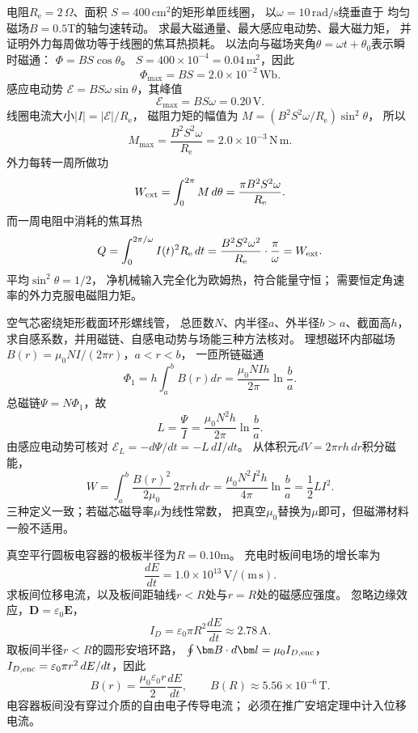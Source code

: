 \problemtext 电阻$R_{\mathrm e}=2\,\Omega$、面积
$S=400\,\mathrm{cm^2}$的矩形单匝线圈，
以$\omega=10\,\mathrm{rad/s}$绕垂直于
均匀磁场$B=0.5$T的轴匀速转动。
求最大磁通量、最大感应电动势、最大磁力矩，
并证明外力每周做功等于线圈的焦耳热损耗。
\workings
以法向与磁场夹角$\theta=\omega t+\theta_0$表示瞬时磁通：
$\Phi=BS\cos\theta$。
$S=400\times10^{-4}=0.04\,\mathrm{m^2}$，因此
\[
\boxed{\Phi_{\max}=BS=2.0\times10^{-2}\,\mathrm{Wb}}.
\]
感应电动势
$\mathcal E=BS\omega\sin\theta$，其峰值
\[
\boxed{\mathcal E_{\max}=BS\omega=0.20\,\mathrm V}.
\]
线圈电流大小$|I|=|\mathcal E|/R_{\mathrm e}$，
磁阻力矩的幅值为
$M=(B^2S^2\omega/R_{\mathrm e})\sin^2\theta$，
所以
\[
\boxed{M_{\max}=\frac{B^2S^2\omega}{R_{\mathrm e}}
=2.0\times10^{-3}\,\mathrm{N\,m}}.
\]
外力每转一周所做功
\[
W_{\rm ext}=\int_0^{2\pi}M\,d\theta
=\frac{\pi B^2S^2\omega}{R_{\mathrm e}}.
\]
而一周电阻中消耗的焦耳热
\[
Q=\int_0^{2\pi/\omega}I(t)^2R_{\mathrm e}\,dt
=\frac{B^2S^2\omega^2}{R_{\mathrm e}}
\cdot\frac\pi\omega=W_{\rm ext}.
\]
\crosscheck 平均$\sin^2\theta=1/2$，
净机械输入完全化为欧姆热，符合能量守恒；
需要恒定角速率的外力克服电磁阻力矩。

\problemtext 空气芯密绕矩形截面环形螺线管，
总匝数$N$、内半径$a$、外半径$b>a$、截面高$h$，
求自感系数，并用磁链、自感电动势与场能三种方法核对。
\workings
理想磁环内部磁场
$B(r)=\mu_0NI/(2\pi r)$，$a<r<b$，
一匝所链磁通
\[
\Phi_1=h\int_a^b B(r)dr
=\frac{\mu_0NIh}{2\pi}\ln\frac ba.
\]
总磁链$\Psi=N\Phi_1$，故
\[
\boxed{L=\frac\Psi I
=\frac{\mu_0N^2h}{2\pi}\ln\frac ba}.
\]
由感应电动势可核对
$\mathcal E_L=-d\Psi/dt=-L\,dI/dt$。
从体积元$dV=2\pi rh\,dr$积分磁能，
\[
W=\int_a^b\frac{B(r)^2}{2\mu_0}\,2\pi rh\,dr
=\frac{\mu_0N^2I^2h}{4\pi}\ln\frac ba
=\frac12LI^2.
\]
\crosscheck 三种定义一致；若磁芯磁导率$\mu$为线性常数，
把真空$\mu_0$替换为$\mu$即可，但磁滞材料一般不适用。

\problemtext 真空平行圆板电容器的极板半径为$R=0.10$m。
充电时板间电场的增长率为
\[
\frac{dE}{dt}=1.0\times10^{13}\,\mathrm{V/(m\,s)}.
\]
求板间位移电流，以及板间距轴线$r<R$处与$r=R$处的磁感应强度。
\workings
忽略边缘效应，$\bm D=\varepsilon_0\bm E$，
\[
\boxed{I_D=\varepsilon_0\pi R^2\frac{dE}{dt}
\approx2.78\,\mathrm A}.
\]
取板间半径$r<R$的圆形安培环路，
$\oint\bm B\cdot d\bm l=\mu_0I_{D,\rm enc}$，
$I_{D,\rm enc}=\varepsilon_0\pi r^2\,dE/dt$，因此
\[
\boxed{B(r)=\frac{\mu_0\varepsilon_0r}{2}\frac{dE}{dt}},
\qquad
\boxed{B(R)\approx5.56\times10^{-6}\,\mathrm T}.
\]
\crosscheck 电容器板间没有穿过介质的自由电子传导电流；
必须在推广安培定理中计入位移电流。

